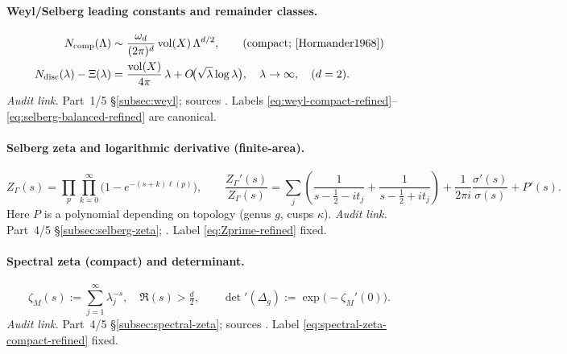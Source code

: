 \paragraph{Weyl/Selberg leading constants and remainder classes.}
\begin{align}
  N_{\mathrm{comp}}(\Lambda) &\sim \frac{\omega_d}{(2\pi)^d}\,\mathrm{vol}(X)\,\Lambda^{d/2},
  \qquad \text{(compact; \cite{Hormander1968})}
  \label{eq:weyl-compact-refined} \\
  N_{\mathrm{disc}}(\lambda) - \Xi(\lambda)
  &= \frac{\mathrm{vol}(X)}{4\pi}\,\lambda + O\!\big(\sqrt{\lambda}\log \lambda\big), \quad \lambda\to\infty, \quad (d=2).
  \label{eq:selberg-balanced-refined}
\end{align}
\textit{Audit link.} Part~1/5 \S\ref{subsec:weyl}; sources \cite{Selberg1956,Hejhal1983,Hejhal1983II,LaxPhillips1976}. Labels \eqref{eq:weyl-compact-refined}–\eqref{eq:selberg-balanced-refined} are canonical.

\paragraph{Selberg zeta and logarithmic derivative (finite-area).}
\begin{equation}
  Z_\Gamma(s) = \prod_{p}\prod_{k=0}^{\infty}\big(1-e^{-(s+k)\ell(p)}\big),\qquad
  \frac{Z_\Gamma'(s)}{Z_\Gamma(s)} =
  \sum_j\!\left(\frac{1}{s-\tfrac12-it_j}+\frac{1}{s-\tfrac12+it_j}\right)
  + \frac{1}{2\pi i}\frac{\sigma'(s)}{\sigma(s)} + P'(s).
  \label{eq:Zprime-refined}
\end{equation}
Here $P$ is a polynomial depending on topology (genus $g$, cusps $\kappa$).
\textit{Audit link.} Part~4/5 \S\ref{subsec:selberg-zeta}; \cite{Selberg1956,Hejhal1983,Hejhal1983II}. Label \eqref{eq:Zprime-refined} fixed.

\paragraph{Spectral zeta (compact) and determinant.}
\begin{equation}
  \zeta_M(s) := \sum_{j=1}^{\infty} \lambda_j^{-s}, \quad \Re(s)>\tfrac d2, \qquad
  \det{}'(\Delta_g) := \exp\!\big(-\zeta_M'(0)\big).
  \label{eq:spectral-zeta-compact-refined}
\end{equation}
\textit{Audit link.} Part~4/5 \S\ref{subsec:spectral-zeta}; sources \cite{Minakshisundaram1949,Seeley1967}. Label \eqref{eq:spectral-zeta-compact-refined} fixed.


